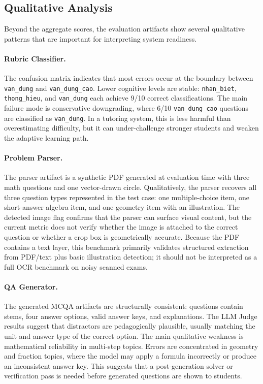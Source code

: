 \documentclass[12pt, a4paper]{article}
\begin{document}
\subsection{Qualitative Analysis}

Beyond the aggregate scores, the evaluation artifacts show several qualitative patterns that are important for interpreting system readiness.

\paragraph{Rubric Classifier.}
The confusion matrix indicates that most errors occur at the boundary between \texttt{van\_dung} and \texttt{van\_dung\_cao}. Lower cognitive levels are stable: \texttt{nhan\_biet}, \texttt{thong\_hieu}, and \texttt{van\_dung} each achieve 9/10 correct classifications. The main failure mode is conservative downgrading, where 6/10 \texttt{van\_dung\_cao} questions are classified as \texttt{van\_dung}. In a tutoring system, this is less harmful than overestimating difficulty, but it can under-challenge stronger students and weaken the adaptive learning path.

\paragraph{Problem Parser.}
The parser artifact is a synthetic PDF generated at evaluation time with three math questions and one vector-drawn circle. Qualitatively, the parser recovers all three question types represented in the test case: one multiple-choice item, one short-answer algebra item, and one geometry item with an illustration. The detected image flag confirms that the parser can surface visual content, but the current metric does not verify whether the image is attached to the correct question or whether a crop box is geometrically accurate. Because the PDF contains a text layer, this benchmark primarily validates structured extraction from PDF/text plus basic illustration detection; it should not be interpreted as a full OCR benchmark on noisy scanned exams.

\paragraph{QA Generator.}
The generated MCQA artifacts are structurally consistent: questions contain stems, four answer options, valid answer keys, and explanations. The LLM Judge results suggest that distractors are pedagogically plausible, usually matching the unit and answer type of the correct option. The main qualitative weakness is mathematical reliability in multi-step topics. Errors are concentrated in geometry and fraction topics, where the model may apply a formula incorrectly or produce an inconsistent answer key. This suggests that a post-generation solver or verification pass is needed before generated questions are shown to students.
\end{document}
